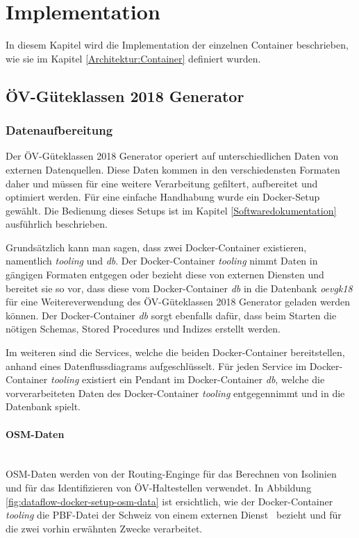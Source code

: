 
\section{Implementation}
\label{Implementation}

In diesem Kapitel wird die Implementation der einzelnen Container beschrieben, wie sie im Kapitel \ref{Architektur:Container} definiert wurden.

\subsection{ÖV-Güteklassen 2018 Generator}
\label{Implementation:ÖV-Güteklassen 2018 Generator}

\subsubsection{Datenaufbereitung}
\label{ÖV-Güteklassen 2018 Generator:Datenaufbereitung}

Der \acs{ÖV}-Güteklassen 2018 Generator operiert auf unterschiedlichen Daten von externen Datenquellen.
Diese Daten kommen in den verschiedensten Formaten daher und müssen für eine weitere Verarbeitung gefiltert, aufbereitet und optimiert werden.
Für eine einfache Handhabung wurde ein Docker-Setup gewählt.
Die Bedienung dieses Setups ist im Kapitel \ref{Softwaredokumentation} ausführlich beschrieben.

Grundsätzlich kann man sagen, dass zwei Docker-Container existieren, namentlich \emph{tooling} und \emph{db}.
Der Docker-Container \emph{tooling} nimmt Daten in gängigen Formaten entgegen oder bezieht diese von externen Diensten und bereitet sie so vor, dass diese vom Docker-Container \emph{db} in die Datenbank \emph{oevgk18} für eine Weitereverwendung des \acs{ÖV}-Güteklassen 2018 Generator geladen werden können.
Der Docker-Container \emph{db} sorgt ebenfalls dafür, dass beim Starten die nötigen Schemas, Stored Procedures und Indizes erstellt werden.

Im weiteren sind die Services, welche die beiden Docker-Container bereitstellen, anhand eines Datenflussdiagrams aufgeschlüsselt.
Für jeden Service im Docker-Container \emph{tooling} existiert ein Pendant im Docker-Container \emph{db}, welche die vorverarbeiteten Daten des Docker-Container \emph{tooling} entgegennimmt und in die Datenbank spielt.

\paragraph{OSM-Daten}~\\
\acs{OSM}-Daten werden von der Routing-Enginge für das Berechnen von Isolinien und für das Identifizieren von \acs{ÖV}-Haltestellen verwendet.
In Abbildung \ref{fig:dataflow-docker-setup-osm-data} ist ersichtlich, wie der Docker-Container \emph{tooling} die \acs{PBF}-Datei der Schweiz von einem externen Dienst~\cite{planet_osm_ch} bezieht und für die zwei vorhin erwähnten Zwecke verarbeitet.

